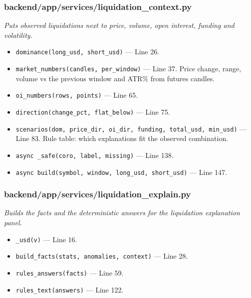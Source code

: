 \subsubsection*{backend/app/services/liquidation\_context.py}
\textit{Puts observed liquidations next to price, volume, open interest, funding and volatility.}
\begin{itemize}[nosep,leftmargin=1.5em]
\item \texttt{dominance(\allowbreak{}long\_\allowbreak{}usd,\allowbreak{} short\_\allowbreak{}usd)} --- Line 26.
\item \texttt{market\_\allowbreak{}numbers(\allowbreak{}candles,\allowbreak{} per\_\allowbreak{}window)} --- Line 37. Price change, range, volume vs the previous window and ATR\% from futures candles.
\item \texttt{oi\_\allowbreak{}numbers(\allowbreak{}rows,\allowbreak{} points)} --- Line 65.
\item \texttt{direction(\allowbreak{}change\_\allowbreak{}pct,\allowbreak{} flat\_\allowbreak{}below)} --- Line 75.
\item \texttt{scenarios(\allowbreak{}dom,\allowbreak{} price\_\allowbreak{}dir,\allowbreak{} oi\_\allowbreak{}dir,\allowbreak{} funding,\allowbreak{} total\_\allowbreak{}usd,\allowbreak{} min\_\allowbreak{}usd)} --- Line 83. Rule table: which explanations fit the observed combination.
\item \texttt{async \_\allowbreak{}safe(\allowbreak{}coro,\allowbreak{} label,\allowbreak{} missing)} --- Line 138.
\item \texttt{async build(\allowbreak{}symbol,\allowbreak{} window,\allowbreak{} long\_\allowbreak{}usd,\allowbreak{} short\_\allowbreak{}usd)} --- Line 147.
\end{itemize}
\subsubsection*{backend/app/services/liquidation\_explain.py}
\textit{Builds the facts and the deterministic answers for the liquidation explanation panel.}
\begin{itemize}[nosep,leftmargin=1.5em]
\item \texttt{\_\allowbreak{}usd(\allowbreak{}v)} --- Line 16.
\item \texttt{build\_\allowbreak{}facts(\allowbreak{}stats,\allowbreak{} anomalies,\allowbreak{} context)} --- Line 28.
\item \texttt{rules\_\allowbreak{}answers(\allowbreak{}facts)} --- Line 59.
\item \texttt{rules\_\allowbreak{}text(\allowbreak{}answers)} --- Line 122.
\end{itemize}
